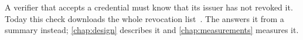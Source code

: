 \chapter{\bevezetes}\label{chap:intro}

A verifier that accepts a credential must know that its issuer has not revoked it. Today this
check downloads the whole revocation list~\cite{lamport1978time}. The \registry answers it from a
summary instead; \autoref{chap:design} describes it and \autoref{chap:measurements} measures it.
